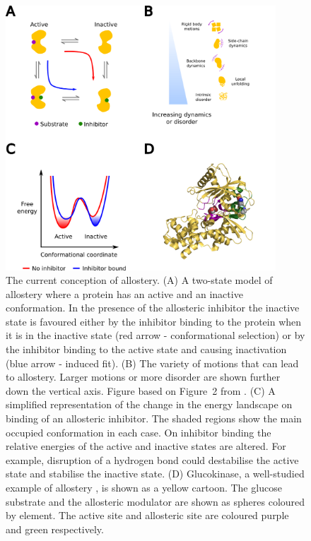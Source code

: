 \begin{figure}
\centering

\includegraphics[width=0.9\textwidth]{figures/allostery/allostery}

\caption[The current conception of allostery as a result of the conformational ensemble]
{The current conception of allostery.
(A) A two-state model of allostery where a protein has an active and an inactive conformation.
In the presence of the allosteric inhibitor the inactive state is favoured either by the inhibitor binding to the protein when it is in the inactive state (red arrow - conformational selection) or by the inhibitor binding to the active state and causing inactivation (blue arrow - induced fit).
(B) The variety of motions that can lead to allostery.
Larger motions or more disorder are shown further down the vertical axis.
Figure based on Figure~2 from \cite{Motlagh2014}.
(C) A simplified representation of the change in the energy landscape on binding of an allosteric inhibitor.
The shaded regions show the main occupied conformation in each case.
On inhibitor binding the relative energies of the active and inactive states are altered.
For example, disruption of a hydrogen bond could destabilise the active state and stabilise the inactive state.
(D) Glucokinase, a well-studied example of allostery \cite{Kamata2004}, is shown as a yellow cartoon.
The glucose substrate and the allosteric modulator are shown as spheres coloured by element.
The active site and allosteric site are coloured purple and green respectively.}

\label{fig:allostery}
\end{figure}


